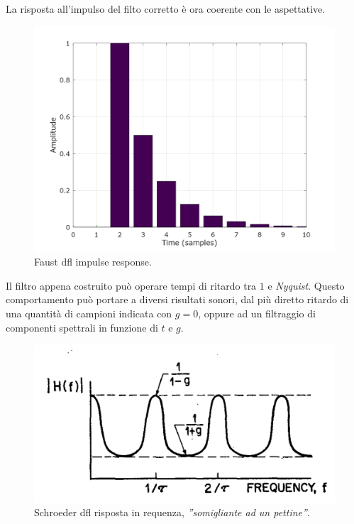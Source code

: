 \begin{refsection}


La risposta all'impulso del filto corretto è ora coerente con le aspettative.

\begin{figure}[ht]
  \centering
  \includegraphics[width=\textwidth]{CAPITOLI/0500/CODES/REV/dflc.png}
  \caption[]{Faust dfl impulse response.}
  \label{faust:dflir}
\end{figure}

Il filtro appena costruito può operare tempi di ritardo tra $1$ e \emph{Nyquist}.
Questo comportamento può portare a diversi risultati sonori, dal più diretto
ritardo di una quantità di campioni indicata con $g=0$, oppure ad un filtraggio di componenti
spettrali in funzione di $t$ e $g$.

\begin{figure}[h]
  \centering
  \includegraphics[width=\textwidth]{CAPITOLI/0500/IMG/dfl-fr.png}
  \caption[]{Schroeder dfl risposta in requenza, \emph{”somigliante ad un pettine”}.}
  \label{schroeder:dflffr}
\end{figure}


\end{refsection}
